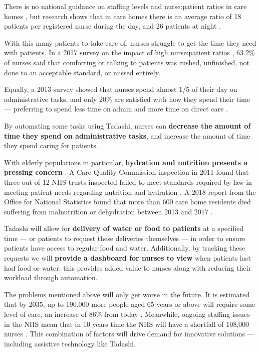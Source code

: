\documentclass{article}
\begin{document}
There is no national guidance on staffing levels and nurse:patient ratios in care homes \cite{rcnstaffingadvice}, but research shows that in care homes there is an average ratio of 18 patients per registered nurse during the day, and 26 patients at night \cite{rcnstaffingguidance}.

With this many patients to take care of, nurses struggle to get the time they need with patients. In a 2017 survey on the impact of high nurse:patient ratios \cite{unison}, 63.2\% of nurses said that comforting or talking to patients was rushed, unfinished, not done to an acceptable standard, or missed entirely.

Equally, a 2013 survey showed that nurses spend almost 1/5 of their day on administrative tasks, and only 20\% are satisfied with how they spend their time --- preferring to spend less time on admin and more time on direct care \cite{rcnpol}.

By automating some tasks using Tadashi, nurses can {\bf decrease the amount of time they spend on administrative tasks}, and increase the amount of time they spend caring for patients.

With elderly populations in particular, {\bf hydration and nutrition presents a pressing concern} \cite{hydrate}. A Care Quality Commission inspection in 2011 found that three out of 12 NHS trusts inspected failed to meet standards required by law in meeting patient needs regarding nutrition and hydration \cite{cqc}. A 2018 report from the Office for National Statistics found that more than 600 care home residents died suffering from malnutrition or dehydration between 2013 and 2017 \cite{ons}.

Tadashi will allow for {\bf delivery of water or food to patients} at a specified time --- or patients to request these deliveries themselves --- in order to ensure patients have access to regular food and water. Additionally, by tracking these requests we will {\bf provide a dashboard for nurses to view} when patients last had food or water: this provides added value to nurses along with reducing their workload through automation. 

The problems mentioned above will only get worse in the future. It is estimated that by 2035, up to 190,000 more people aged 65 years or above will require some level of care, an increase of 86\% from today \cite{lancet}. Meanwhile, ongoing staffing issues in the NHS mean that in 10 years time the NHS will have a shortfall of 108,000 nurses \cite{nuffield}. This combination of factors will drive demand for innovative solutions --- including assistive technology like Tadashi.
\end{document}
